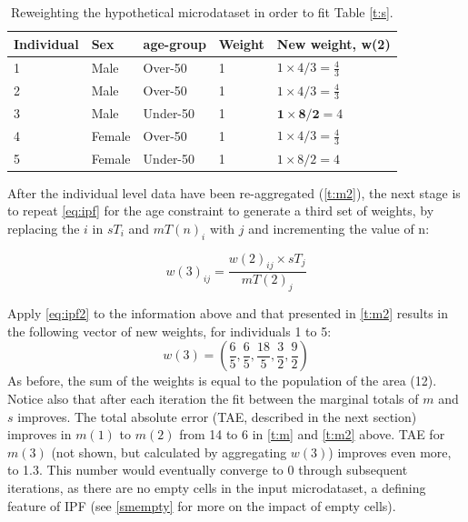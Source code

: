 \documentclass[a4paper,10pt]{article}
\begin{document}
\begin{table}[htbp]
\centering
\caption{Reweighting the hypothetical microdataset in order to fit
Table \ref{t:s}.}
\begin{tabular}{lllll}
\toprule
{Individual} & {Sex} & {age-group} & {Weight} &
{New weight, w(2)} \\ \midrule
1 & Male & Over-50 & 1 & $1 \times 4/3 = \frac{4}{3}$ \\
2 & Male & Over-50 & 1 & $1 \times 4/3 = \frac{4}{3}$ \\
3 & Male & Under-50 & 1 & $\textbf{1} \times
\textbf{8}/\textbf{2} = 4$ \\
4 & Female & Over-50 & 1 & $1 \times 4/3 = \frac{4}{3}$ \\
5 & Female & Under-50 & 1 & $1 \times 8/2 = 4$ \\
\bottomrule
\end{tabular}
\label{t:new-weights}
\end{table}

After the individual level data have been re-aggregated (\cref{t:m2}),
the next stage is to repeat \cref{eq:ipf} for the age constraint to generate a
third set of weights, by replacing
the $i$ in $sT_{i}$ and $mT(n)_{i}$ with $j$ and incrementing the value of n:

\begin{equation}
w(3)_{ij} = \frac{w(2)_{ij} \times sT_{j}}{mT(2)_{j}}
\label{eq:ipf2}
\end{equation}

Apply \cref{eq:ipf2} to the information above and that presented in \cref{t:m2}
results in the following vector of new weights, for individuals 1 to 5:
\begin{equation}
  w(3) = (\frac{6}{5}, \frac{6}{5}, \frac{18}{5}, \frac{3}{2}, \frac{9}{2})
\end{equation}
As before, the sum of the weights is equal to the population of the area (12).
Notice also that after each iteration the fit between the marginal
totals of $m$ and $s$
improves. The total absolute error (TAE, described in the next section)
improves in $m(1)$ to $m(2)$ from
14 to 6 in \cref{t:m} and \cref{t:m2} above. TAE for $m(3)$ (not shown,
but calculated by aggregating $w(3)$) improves even more, to 1.3.
This number would eventually converge to 0 through subsequent
iterations, as there are no empty cells in the input microdataset,
a defining feature of IPF (see \cref{smempty} for more on the impact of empty cells).
\end{document}
